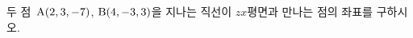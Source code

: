 두 점~$\mathrm{A}(2{,}\mkern3mu\mathopen{}3{,}\mkern3mu\mathopen{}-7)$, $\mathrm{B}(4{,}\mkern3mu\mathopen{}-3{,}\mkern3mu\mathopen{}3)$을 지나는 직선이 $zx$평면과 만나는 점의 좌표를 구하시오.

